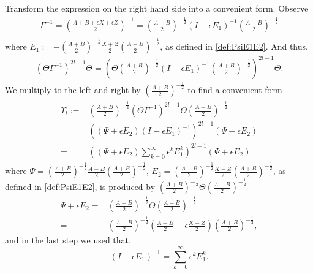 \documentclass{article}
\numberwithin{equation}{section}
\begin{document}
Transform the expression on the right hand side into a convenient form. Observe
\begin{align*}
\Gamma^{-1}  = \left( \frac{A + B + \epsilon X + \epsilon Z}{2} \right)^{-1}
= \left( \frac{A+B}{2} \right)^{-\frac{1}{2}} (I - \epsilon E_1)^{-1} \left( \frac{A+B}{2} \right)^{-\frac{1}{2}} \\
\end{align*}
where $E_1:=-\left( \frac{A+B}{2} \right)^{-\frac{1}{2}} \frac{ X+  Z}{2} \left( \frac{A+B}{2} \right)^{-\frac{1}{2}}$, as defined in \eqref{def:PsiE1E2}. And thus,
\begin{equation*}
\begin{aligned}
 (\Theta\Gamma^{-1})^{2l-1}\Theta = \left( \Theta \left( \frac{A+B}{2} \right)^{-\frac{1}{2}} (I - \epsilon E_{1})^{-1} \left( \frac{A+B}{2} \right)^{-\frac{1}{2}} \right)^{2l-1}\Theta.
\end{aligned}
\end{equation*}
We multiply to the left and right by $\left( \frac{A+B}{2} \right)^{-\frac{1}{2}}$ to find a convenient form
\begin{align}\label{def:UpsilonL}
\begin{split}
\Upsilon_l:=&\left( \frac{A+B}{2} \right)^{-\frac{1}{2}}  (\Theta\Gamma^{-1})^{2l-1}\Theta
\left( \frac{A+B}{2} \right)^{-\frac{1}{2}}\\
= &\left( (\Psi + \epsilon E_{2}) (I - \epsilon E_{1})^{-1} \right)^{2l-1} (\Psi + \epsilon E_{2})\\
=&\left( (\Psi + \epsilon E_{2}) \sum_{k=0}^{\infty} \epsilon^k E_1^{k} \right)^{2l-1} (\Psi + \epsilon E_{2}).
\end{split}
\end{align}
where $\Psi=\left( \frac{A+B}{2} \right)^{-\frac{1}{2}} \frac{A-B}{2} \left( \frac{A+B}{2} \right)^{-\frac{1}{2}}$, $E_{2}=\left( \frac{A+B}{2} \right)^{-\frac{1}{2}} \frac{ X-  Z}{2} \left( \frac{A+B}{2} \right)^{-\frac{1}{2}}$, as defined in \eqref{def:PsiE1E2}, is produced by $\left( \frac{A+B}{2} \right)^{-\frac{1}{2}} \Theta \left( \frac{A+B}{2} \right)^{-\frac{1}{2}}$
\begin{align*}
\Psi + \epsilon E_{2} =&\left( \frac{A+B}{2} \right)^{-\frac{1}{2}} \Theta \left( \frac{A+B}{2} \right)^{-\frac{1}{2}}\\
=& \left( \frac{A+B}{2} \right)^{-\frac{1}{2}} \left( \frac{A-B}{2} + \epsilon\frac{ X-  Z}{2} \right) \left( \frac{A+B}{2} \right)^{-\frac{1}{2}},
\end{align*} and in the last step we used that,
\begin{equation*}
    (I-\epsilon E_1)^{-1}=\sum_{k=0}^{\infty}\epsilon^k E_1^{k}.
\end{equation*}
\end{document}
